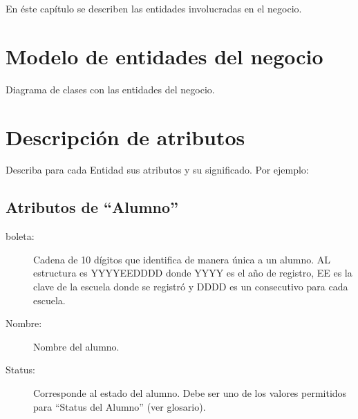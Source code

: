 En \'este cap\'itulo se describen las entidades involucradas en el negocio.

\section{Modelo de entidades del negocio}

Diagrama de clases con las entidades del negocio.


\section{Descripción de atributos}

Describa para cada Entidad sus atributos y su significado. Por ejemplo:

\subsection{Atributos de ``Alumno''}

\begin{description}
	\item[boleta: ] Cadena de 10 dígitos que identifica de manera única a un alumno. AL estructura es YYYYEEDDDD  donde YYYY es el año de registro, EE es la clave de la escuela donde se registró y DDDD es un consecutivo para cada escuela.
	\item[Nombre: ] Nombre del alumno.
	\item[Status: ] Corresponde al estado del alumno. Debe ser uno de los valores permitidos para ``Status del Alumno'' (ver glosario).
\end{description}

